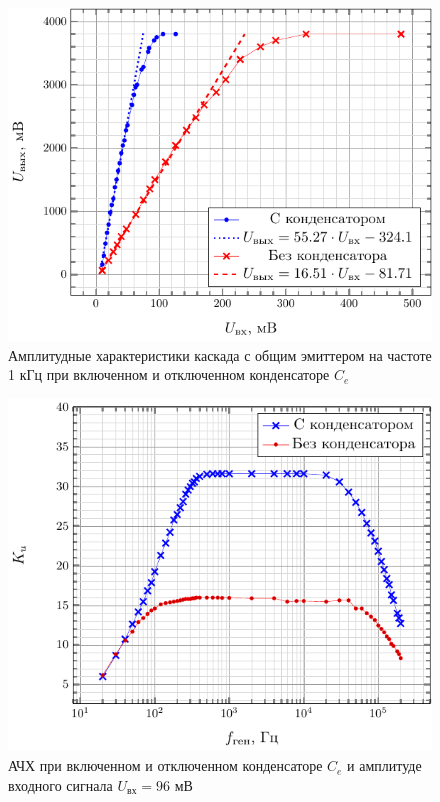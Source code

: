 \begin{figure}[H]
	\centering
	\includegraphics[scale=1.1]{plot/fig1}
	\caption{Амплитудные характеристики каскада с общим эмиттером на частоте 1 кГц при включенном и отключенном конденсаторе $C_e$}
	\label{fig:oe_ampamp}
\end{figure}

\begin{figure}[H]
	\centering
	\includegraphics[scale=1.1]{plot/fig2}
	\caption{АЧХ при включенном и отключенном конденсаторе $C_{e}$ и амплитуде входного сигнала $U_\text{вх}= 96$ мВ}
	\label{fig:15}
\end{figure}

